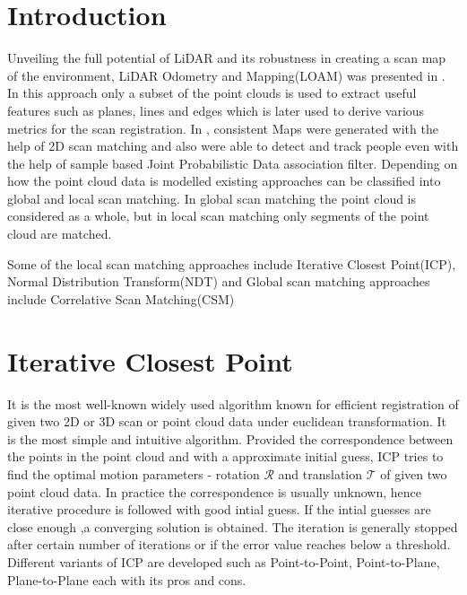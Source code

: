 \section*{Introduction}
Unveiling the full potential of LiDAR and its robustness in creating a scan map of the environment,
LiDAR Odometry and Mapping(LOAM) was presented in \cite{ZhangS14}. In this approach only a subset of the point clouds is used to extract useful features such as planes, lines and edges which is later 
used to derive various metrics for the scan registration. In \cite{D.Hahnel}, consistent Maps were generated with the help of 2D scan matching and also were able to detect and track people
even with the help of sample based Joint Probabilistic Data association filter.
Depending on how the point cloud data is modelled existing approaches can be classified into 
global and local scan matching. In global scan matching the point cloud is considered as a whole, but in local scan matching only segments of the point cloud are matched.

Some of the local scan matching approaches include Iterative Closest Point(ICP), Normal  Distribution Transform(NDT) and Global scan matching approaches include Correlative Scan Matching(CSM)

\section{Iterative Closest Point}
    It is the most well-known widely used algorithm known for  efficient registration of given two 2D or 3D scan or point cloud data under euclidean transformation. It is the most simple and intuitive algorithm.
Provided the correspondence between the points in the point cloud and with a  approximate initial guess, ICP tries to find the optimal motion parameters - rotation $\mathcal{R}$ and translation $\mathcal{T}$ of given 
two point cloud data. In practice the correspondence is usually unknown, hence iterative procedure is followed with good intial guess. If the intial guesses are close enough ,a converging solution is obtained.
The iteration is generally stopped after certain number of iterations or if the error value reaches below a threshold. Different variants of ICP are developed such as Point-to-Point, Point-to-Plane,
Plane-to-Plane each with its pros and cons. 

